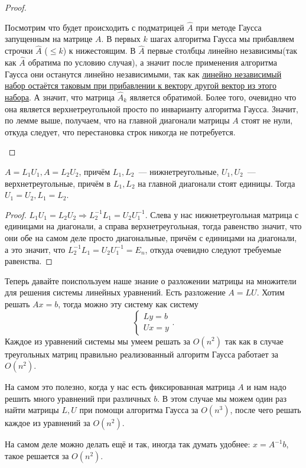 \begin{proof}
\begin{itemize}
            Посмотрим что будет происходить с подматрицей $\hat{A}$ при методе Гаусса запущенным на матрице $A$.
            В первых $k$ шагах алгоритма Гаусса мы прибавляем строчки $\hat{A}$ ($\le k$) к нижестоящим.
            В $\hat{A}$ первые столбцы линейно независимы(так как $\hat{A}$ обратима по условию случая), а значит после
            применения алгоритма Гаусса они останутся линейно независимыми, так как
            \hyperref[2]{линейно независимый набор остаётся таковым при прибавлении к вектору другой вектор из этого набора}.
            А значит, что матрица $\hat{A}_k$ является обратимой. Более того, очевидно что она является верхнетреугольной просто
            по инварианту алгоритма Гаусса. Значит, по лемме выше, получаем, что на главной диагонали матрицы $A$ стоят не нули,
            откуда следует, что перестановка строк никогда не потребуется.
    \end{itemize}
\end{proof}
\begin{statement}
    $A = L_1U_1, A = L_2U_2$, причём $L_1,L_2$~--- нижнетреугольные, $U_1, U_2$~--- верхнетреугольные,
    причём в $L_1,L_2$ на главной диагонали стоят единицы. Тогда $U_1=U_2, L_1 =L_2$.
\end{statement}
\begin{proof}
    $L_1U_1 = L_2U_2\Rightarrow L_2^{-1}L_1 = U_2U_1^{-1}$. Слева у нас 
    нижнетреугольная матрица с единицами на диагонали, а справа верхнетреугольная, тогда равенство значит,
    что они обе на самом деле просто диагональные, причём с единицами на диагонали, 
    а это значит, что $L_2^{-1}L_1 = U_2U_1^{-1} = E_n$, откуда очевидно следуют требуемые равенства.
\end{proof}
\begin{remark}
    Теперь давайте поиспользуем наше знание о разложении матрицы на множители для 
    решения системы линейных уравнений.
    Есть разложение $A = LU$.
    Хотим решать $Ax = b$, 
    тогда можно эту систему как систему
    \[
    \begin{cases}
        Ly = b\\
        Ux = y
    \end{cases}
    .\] 
    Каждое из уравнений системы мы умеем решать за $O(n^2)$ так как в случае треугольных матриц правильно реализованный
    алгоритм Гаусса работает за $O(n^2)$. 

    На самом это полезно, когда у нас есть фиксированная матрица $A$ и 
    нам надо решить много уравнений при различных $b$. 
    В этом случае мы можем один раз найти матрицы $L, U$ при помощи алгоритма Гаусса за $O(n^3)$, после чего решать
    каждое из уравнений за $O(n^2)$.

    На самом деле можно делать ещё и так, иногда так думать удобнее:
    $x = A^{-1}b$, такое решается за  $O(n^2)$.
\end{remark}
